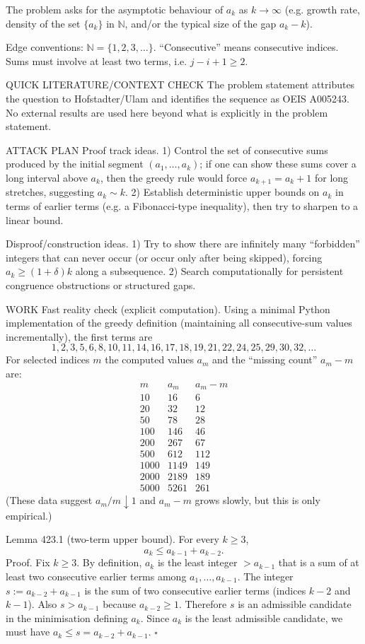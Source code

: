 The problem asks for the asymptotic behaviour of $a_k$ as $k\to\infty$ (e.g. growth rate, density of the set $\{a_k\}$ in $\mathbb N$, and/or the typical size of the gap $a_k-k$).

Edge conventions: $\mathbb N=\{1,2,3,\dots\}$. “Consecutive” means consecutive indices. Sums must involve at least two terms, i.e. $j-i+1\ge 2$.

QUICK LITERATURE/CONTEXT CHECK
The problem statement attributes the question to Hofstadter/Ulam and identifies the sequence as OEIS A005243. No external results are used here beyond what is explicitly in the problem statement.

ATTACK PLAN
Proof track ideas.
1) Control the set of consecutive sums produced by the initial segment $(a_1,\dots,a_{k})$; if one can show these sums cover a long interval above $a_k$, then the greedy rule would force $a_{k+1}=a_k+1$ for long stretches, suggesting $a_k\sim k$.
2) Establish deterministic upper bounds on $a_k$ in terms of earlier terms (e.g. a Fibonacci-type inequality), then try to sharpen to a linear bound.

Disproof/construction ideas.
1) Try to show there are infinitely many “forbidden” integers that can never occur (or occur only after being skipped), forcing $a_k\ge (1+\delta)k$ along a subsequence.
2) Search computationally for persistent congruence obstructions or structured gaps.

WORK
Fast reality check (explicit computation).
Using a minimal Python implementation of the greedy definition (maintaining all consecutive-sum values incrementally), the first terms are
\[
1,2,3,5,6,8,10,11,14,16,17,18,19,21,22,24,25,29,30,32,\dots
\]
For selected indices $m$ the computed values $a_m$ and the “missing count” $a_m-m$ are:
\[
\begin{array}{c|c|c}
 m & a_m & a_m-m\\\hline
10&16&6\\
20&32&12\\
50&78&28\\
100&146&46\\
200&267&67\\
500&612&112\\
1000&1149&149\\
2000&2189&189\\
5000&5261&261
\end{array}
\]
(These data suggest $a_m/m\downarrow 1$ and $a_m-m$ grows slowly, but this is only empirical.)

Lemma 423.1 (two-term upper bound).
For every $k\ge 3$,
\[
 a_k\le a_{k-1}+a_{k-2}.
\]
Proof.
Fix $k\ge 3$. By definition, $a_k$ is the least integer $>a_{k-1}$ that is a sum of at least two consecutive earlier terms among $a_1,\dots,a_{k-1}$.
The integer $s:=a_{k-2}+a_{k-1}$ is the sum of two consecutive earlier terms (indices $k-2$ and $k-1$). Also $s>a_{k-1}$ because $a_{k-2}\ge 1$.
Therefore $s$ is an admissible candidate in the minimisation defining $a_k$. Since $a_k$ is the least admissible candidate, we must have $a_k\le s=a_{k-2}+a_{k-1}$.
\hfill $\square$

